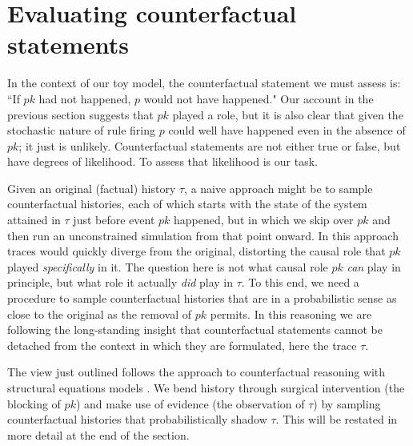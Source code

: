 
\newcommand{\PCFST}[0]{\mathbf{P}\left( \,\UPDATE{\tau}{[\iota]} \models \psi \,\right)}
\newcommand{\ItAbduction}[0]{(\textbf{abduction})}
\newcommand{\ItAction}[0]{(\textbf{action})}
\newcommand{\ItPrediction}[0]{(\textbf{prediction})}


\section{Evaluating counterfactual statements}\label{sec:counterfactual}


In the context of our toy model, the counterfactual statement we must assess is: ``If $pk$ had not happened, $p$ would not have happened." Our account in the previous section suggests that $pk$ played a role, but it is also clear that given the stochastic nature of rule firing $p$ could well have happened even in the absence of $pk$; it just is unlikely. Counterfactual statements are not either true or false, but have degrees of likelihood. To assess that likelihood is our task.

Given an original (factual) history $\tau$, a naive approach might be to sample counterfactual histories, each of which starts with the state of the system attained in $\tau$ just before event $pk$ happened, but in which we skip over $pk$ and then run an unconstrained simulation from that point onward. In this approach traces would quickly diverge from the original, distorting the causal role that $pk$ played \emph{specifically} in it.  The question here is not what causal role $pk$ \emph{can} play in principle, but what role it actually \emph{did} play in $\tau$. To this end, we need a procedure to sample counterfactual histories that are in a probabilistic sense as close to the original as the removal of $pk$ permits. In this reasoning we are following the long-standing insight \cite{lewis1974causation,pearlXX} that counterfactual statements cannot be detached from the context in which they are formulated, here the trace $\tau$.

The view just outlined follows the approach to counterfactual reasoning with structural equations models \cite{PearlXX,HitchcockXX}. We bend history through surgical intervention (the blocking of $pk$) and make use of evidence (the observation of $\tau$) by sampling counterfactual histories that probabilistically shadow $\tau$. This will be restated in more detail at the end of the section. 

